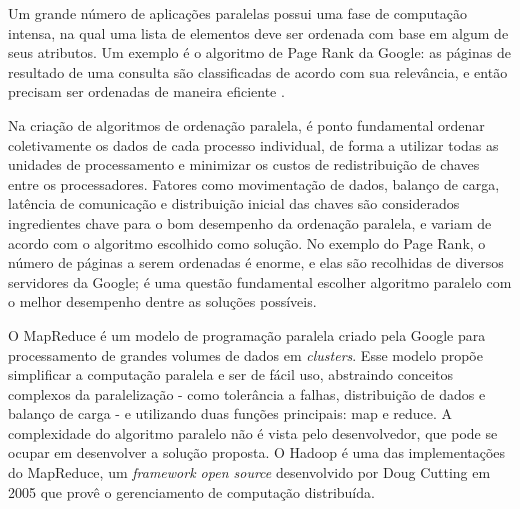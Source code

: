 

Um grande número de aplicações paralelas possui uma fase de computação intensa, na qual uma lista de elementos deve ser ordenada com base em algum de seus atributos. Um exemplo é o algoritmo de Page Rank \citep{PageRank:1999} da Google: as páginas de resultado de uma consulta são classificadas de acordo com sua relevância, e então precisam ser ordenadas de maneira eficiente \citep{Kale:2010}.

Na criação de algoritmos de ordenação paralela, é ponto fundamental ordenar coletivamente os dados de cada processo individual, de forma a utilizar todas as unidades de processamento e minimizar os custos de redistribuição de chaves entre os processadores. Fatores como movimentação de dados, balanço de carga, latência de comunicação e distribuição inicial das chaves são considerados ingredientes chave para o bom desempenho da ordenação paralela, e variam de acordo com o algoritmo escolhido como solução\citep{Kale:2010}. 
No exemplo do Page Rank, o número de páginas a serem ordenadas é enorme, e elas são recolhidas de diversos servidores da Google; é uma questão fundamental escolher algoritmo paralelo com o melhor desempenho dentre as soluções possíveis.


O MapReduce\citep{Dean:2008}  é um modelo de programação paralela criado pela Google para processamento de grandes volumes de dados em \textit{clusters}. Esse modelo propõe simplificar a computação paralela e ser de fácil uso, abstraindo conceitos complexos da paralelização - como tolerância a falhas, distribuição de dados e balanço de carga - e utilizando duas funções principais: map e reduce. A complexidade do algoritmo paralelo não é vista pelo desenvolvedor, que pode se ocupar em desenvolver a solução proposta. O Hadoop \citep{Hadoop:2010} é uma das implementações do MapReduce, um \textit{framework open source } desenvolvido por Doug Cutting em 2005 que provê o gerenciamento de computação distribuída. %

